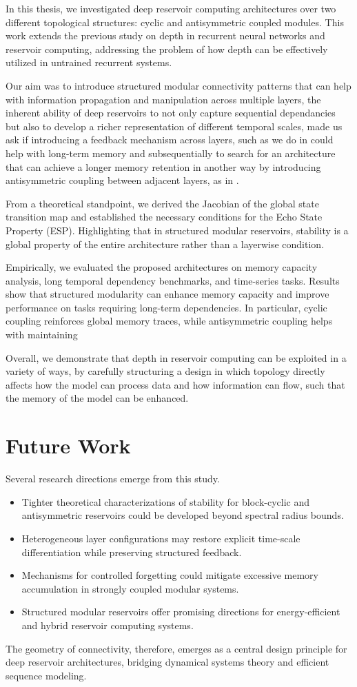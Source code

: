 


In this thesis, we investigated deep reservoir computing architectures over two different topological structures:
 cyclic and antisymmetric coupled modules.
This work extends the previous study on depth in recurrent neural networks and reservoir computing, 
addressing the problem of how depth can be effectively utilized in untrained recurrent systems.

Our aim was to introduce structured modular connectivity patterns that can help with information propagation and manipulation across multiple layers,
the inherent ability of deep reservoirs to not only capture sequential dependancies but also to develop a richer representation of different temporal scales,
made us ask if introducing a feedback mechanism across layers, such as we do in \DCR\@ could help with long-term memory and subsequentially to search for an architecture that
can achieve a longer memory retention in another way by introducing antisymmetric coupling between adjacent layers, as in \DAR.

From a theoretical standpoint, we derived the Jacobian of the global state transition map and established the necessary 
conditions for the Echo State Property (ESP).
Highlighting that in structured modular reservoirs, stability is a global property of the entire architecture rather than a layerwise condition.

Empirically, we evaluated the proposed architectures on memory capacity analysis, long temporal dependency benchmarks, and time-series tasks.
 Results show that structured modularity can enhance memory capacity and improve performance on tasks requiring long-term dependencies.
In particular, cyclic coupling reinforces global memory traces, while antisymmetric coupling helps with maintaining

Overall, we demonstrate that depth in reservoir computing can be exploited in a variety of ways, 
by carefully structuring a design in which topology directly affects how the model can process data and how information can flow, such that the memory of the model can be enhanced.


\section{Future Work}

Several research directions emerge from this study. 
\begin{itemize}
    \item Tighter theoretical characterizations of stability for block-cyclic and antisymmetric reservoirs could be developed beyond spectral radius bounds.
    \item Heterogeneous layer configurations may restore explicit time-scale differentiation while preserving structured feedback. 
    \item Mechanisms for controlled forgetting could mitigate excessive memory accumulation in strongly coupled modular systems. 
    \item Structured modular reservoirs offer promising directions for energy-efficient and hybrid reservoir computing systems.
\end{itemize}

The geometry of connectivity, therefore, emerges as a central design principle for deep reservoir architectures,
bridging dynamical systems theory and efficient sequence modeling.
